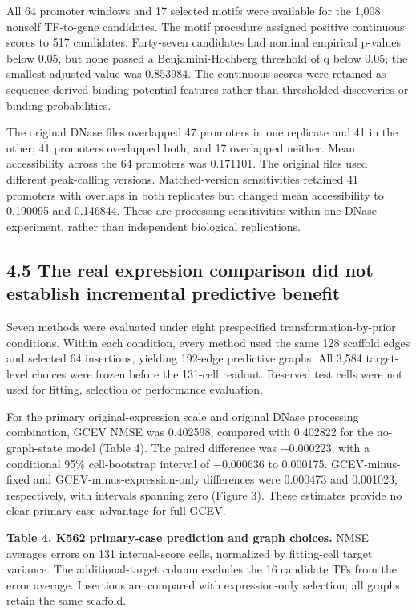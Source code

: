 \documentclass[
  11pt,
]{article}
\begin{document}
All 64 promoter windows and 17 selected motifs were available for the
1,008 nonself TF-to-gene candidates. The motif procedure assigned
positive continuous scores to 517 candidates. Forty-seven candidates had
nominal empirical p-values below 0.05, but none passed a
Benjamini-Hochberg threshold of q below 0.05; the smallest adjusted
value was 0.853984. The continuous scores were retained as
sequence-derived binding-potential features rather than thresholded
discoveries or binding probabilities.

The original DNase files overlapped 47 promoters in one replicate and 41
in the other; 41 promoters overlapped both, and 17 overlapped neither.
Mean accessibility across the 64 promoters was 0.171101. The original
files used different peak-calling versions. Matched-version
sensitivities retained 41 promoters with overlaps in both replicates but
changed mean accessibility to 0.190095 and 0.146844. These are
processing sensitivities within one DNase experiment, rather than
independent biological replications.

\subsection{4.5 The real expression comparison did not establish
incremental predictive
benefit}\label{the-real-expression-comparison-did-not-establish-incremental-predictive-benefit}

Seven methods were evaluated under eight prespecified
transformation-by-prior conditions. Within each condition, every method
used the same 128 scaffold edges and selected 64 insertions, yielding
192-edge predictive graphs. All 3,584 target-level choices were frozen
before the 131-cell readout. Reserved test cells were not used for
fitting, selection or performance evaluation.

For the primary original-expression scale and original DNase processing
combination, GCEV NMSE was 0.402598, compared with 0.402822 for the
no-graph-state model (Table 4). The paired difference was −0.000223,
with a conditional 95\% cell-bootstrap interval of −0.000636 to
0.000175. GCEV-minus-fixed and GCEV-minus-expression-only differences
were 0.000473 and 0.001023, respectively, with intervals spanning zero
(Figure 3). These estimates provide no clear primary-case advantage for
full GCEV.

\textbf{Table 4. K562 primary-case prediction and graph choices.} NMSE
averages errors on 131 internal-score cells, normalized by fitting-cell
target variance. The additional-target column excludes the 16 candidate
TFs from the error average. Insertions are compared with expression-only
selection; all graphs retain the same scaffold.
\end{document}
